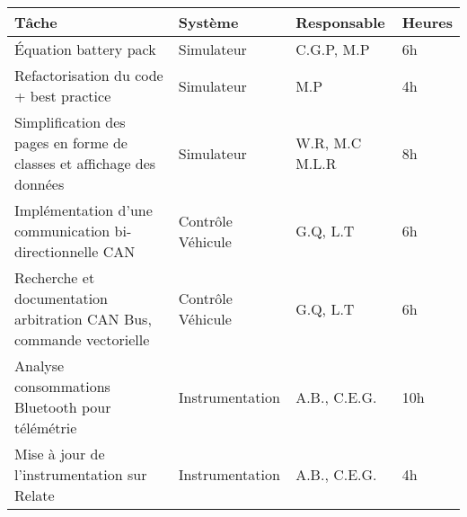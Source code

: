 \begin{tabularx}{\linewidth}{
    |>{\hsize=2.5\hsize}X|%
    >{\hsize=0.5\hsize}X|%
    >{\hsize=0.75\hsize}X|%
    >{\hsize=0.25\hsize}X|%
  }
    \hline
    \textbf{Tâche} & \textbf{Système} & \textbf{Responsable} & \textbf{Heures}\\\hline
     Équation battery pack & Simulateur & C.G.P, M.P & 6h\\\hline %
     Refactorisation du code + best practice  & Simulateur &  M.P & 4h\\\hline %
     Simplification des pages en forme de classes et affichage des données  & Simulateur & W.R, M.C M.L.R  & 8h\\\hline
     Implémentation d'une communication bi-directionnelle CAN & Contrôle Véhicule & G.Q, L.T & 6h\\\hline
     Recherche et documentation arbitration CAN Bus, commande vectorielle & Contrôle Véhicule & G.Q, L.T & 6h\\\hline
     Analyse consommations Bluetooth pour télémétrie & Instrumentation & A.B., C.E.G. & 10h\\\hline
     Mise à jour de l'instrumentation sur Relate & Instrumentation & A.B., C.E.G. & 4h \\\hline
  \end{tabularx}

%
%  